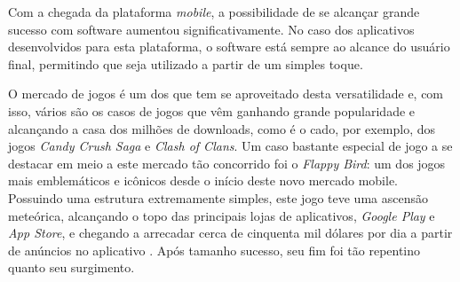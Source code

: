 Com a chegada da plataforma \textit{mobile}, a possibilidade de se alcançar grande sucesso com software aumentou significativamente. No caso dos aplicativos desenvolvidos para esta plataforma, o software está sempre ao alcance do usuário final, permitindo que seja utilizado a partir de um simples toque.

O mercado de jogos é um dos que tem se aproveitado desta versatilidade e, com isso, vários são os casos de jogos que vêm ganhando grande popularidade e alcançando a casa dos milhões de downloads, como é o cado, por exemplo, dos jogos \textit{Candy Crush Saga} e \textit{Clash of Clans}. Um caso bastante especial de jogo a se destacar em meio a este mercado tão concorrido foi o \textit{Flappy Bird}: um dos jogos mais emblemáticos e icônicos desde o início deste novo mercado mobile. Possuindo uma estrutura extremamente simples, este jogo teve uma ascensão meteórica, alcançando o topo das principais lojas de aplicativos, \textit{Google Play} e \textit{App Store}, e chegando a arrecadar cerca de cinquenta mil dólares por dia a partir de anúncios no aplicativo \cite{Warren2014}. Após tamanho sucesso, seu fim foi tão repentino quanto seu surgimento.